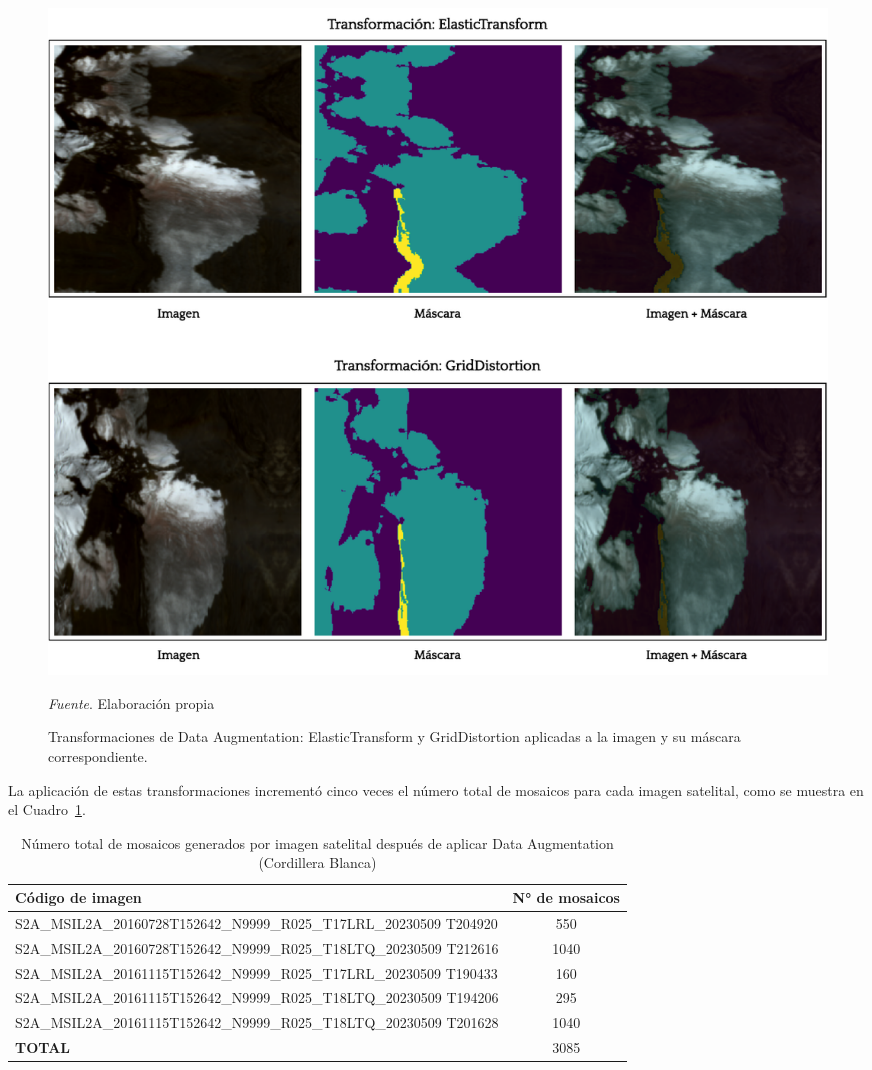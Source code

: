 \documentclass[12pt]{report}
\begin{document}
\begin{figure}[H]
\centering 
\includegraphics[width=1\textwidth]{Images/AumentoDeDatos2.pdf}
\caption{Transformaciones de Data Augmentation: ElasticTransform y GridDistortion aplicadas a la imagen y su máscara correspondiente.}
{\label{fig:AumentoDeDatos2} \textit{Fuente}. Elaboración propia}
\end{figure}

La aplicación de estas transformaciones incrementó cinco veces el número total de mosaicos para cada imagen satelital, como se muestra en el Cuadro~\ref{tab:MosaicosConAumentoDatos}.

\begin{table}[H]
   \centering
   \caption{Número total de mosaicos generados por imagen satelital después de aplicar Data Augmentation (Cordillera Blanca)}
   \begin{tabularx}{1\textwidth}{Xc} 
\hline
\textbf{Código de imagen} & \textbf{N° de mosaicos} \\
\hline
S2A\_MSIL2A\_20160728T152642\_N9999\_R025\_T17LRL\_20230509
T204920 & 550 \\
S2A\_MSIL2A\_20160728T152642\_N9999\_R025\_T18LTQ\_20230509
T212616 & 1040 \\
S2A\_MSIL2A\_20161115T152642\_N9999\_R025\_T17LRL\_20230509
T190433 & 160 \\
S2A\_MSIL2A\_20161115T152642\_N9999\_R025\_T18LTQ\_20230509
T194206 & 295 \\
S2A\_MSIL2A\_20161115T152642\_N9999\_R025\_T18LTQ\_20230509
T201628 & 1040 \\
\hline
\textbf{TOTAL} & 3085 \\
\hline
\end{tabularx}
\label{tab:MosaicosConAumentoDatos}
\end{table}
\end{document}
